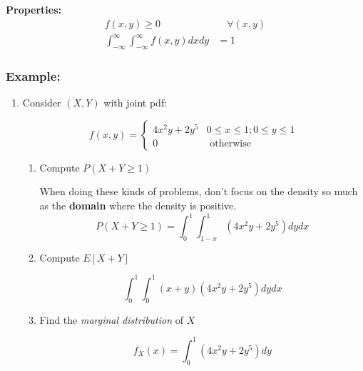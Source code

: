 \documentclass{article}
\begin{document}
\noindent \textbf{Properties:}
\begin{equation*}
    \begin{split}
        f(x,y) \geq 0 &\quad \forall (x,y)\\
        \int_{-\infty}^\infty \int_{-\infty}^\infty f(x,y)dxdy &= 1
    \end{split}
\end{equation*}

\subsubsection*{Example:}

\begin{enumerate}
    \item Consider $(X,Y)$ with joint pdf:

    \begin{equation*}
        f(x,y) = \begin{cases}
            4x^2y + 2y^5 & 0 \leq x \leq 1; 0 \leq y \leq 1\\
            0 & \text{ otherwise}
        \end{cases}
    \end{equation*}

    \begin{enumerate}
        \item Compute $P(X+Y \geq 1)$

        When doing these kinds of problems, don't focus on the density so much as the \textbf{domain} where the density is positive.
        \begin{equation*}
            P(X+Y\geq 1) = \int_0^1 \int_{1-x}^1 (4x^2y+2y^5) dy dx
        \end{equation*}

        \item Compute $E[X+Y]$

        \begin{equation*}
            \int_0^1 \int_0^1 (x+y) (4x^2y+2y^5) dy dx
        \end{equation*}

        \item Find the \textit{marginal distribution} of $X$

        \begin{equation*}
            f_X(x) = \int_0^1 (4x^2y+2y^5)dy
        \end{equation*}
    \end{enumerate}


\end{enumerate}
\end{document}
